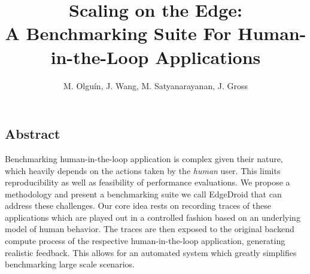 \documentclass[portrait, a1]{KTHEEposter}
\begin{document}
    
    \title{\LARGE\bfseries Scaling on the Edge:\\A Benchmarking Suite For Human-in-the-Loop Applications}
    
    \author{\Large M. Olguín, J. Wang, M. Satyanarayanan, J. Gross}
    \maketitle
    
    \begin{pcolumns}[3]
        \begin{pcolumn}[2]
            \begin{pframe}[.68]
                \section{Abstract}
                Benchmarking human-in-the-loop application is complex given their nature, which heavily depends on the actions taken by the \emph{human} user.
                This limits reproducibility as well as feasibility of performance evaluations.
                We propose a methodology and present a benchmarking suite we call EdgeDroid  that can address these challenges.
                Our core idea rests on recording traces of these applications which are played out in a controlled fashion based on an underlying model of human behavior.
                The traces are then exposed to the original backend compute process of the respective human-in-the-loop application, generating realistic feedback.
                This allows for an automated system which greatly simplifies benchmarking large scale scenarios.
            \end{pframe}
            \begin{pframe}[1.32]

\end{pframe}
\end{pcolumn}
\end{pcolumns}
\end{document}
